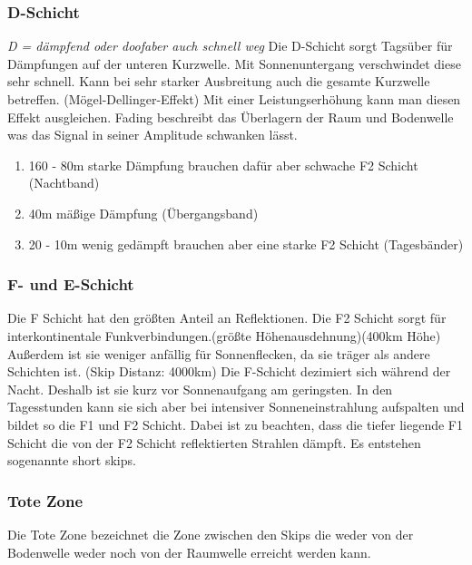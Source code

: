             \subsubsection[]{D-Schicht}
            {\it D = dämpfend oder doof\newline aber auch schnell weg } \newline
            Die D-Schicht sorgt Tagsüber für Dämpfungen auf der unteren Kurzwelle. Mit Sonnenuntergang verschwindet diese sehr schnell. Kann bei sehr starker Ausbreitung auch die gesamte Kurzwelle betreffen. 
            (Mögel-Dellinger-Effekt) Mit einer Leistungserhöhung kann man diesen Effekt ausgleichen.
            Fading beschreibt das Überlagern der Raum und Bodenwelle was das Signal in seiner Amplitude schwanken lässt.
            \begin{enumerate}
                \item 160 - 80m starke Dämpfung brauchen dafür aber schwache F2 Schicht (Nachtband)
                \item 40m mäßige Dämpfung (Übergangsband)
                \item 20 - 10m wenig gedämpft brauchen aber eine starke F2 Schicht (Tagesbänder)
            \end{enumerate}
            \subsubsection[]{F- und E-Schicht}
            Die F Schicht hat den größten Anteil an Reflektionen. \newline
            Die F2 Schicht sorgt für interkontinentale Funkverbindungen.(größte Höhenausdehnung)(400km Höhe) Außerdem ist sie weniger anfällig für Sonnenflecken, da sie träger als andere Schichten ist. (Skip Distanz: 4000km)
            \newline 
            Die F-Schicht dezimiert sich während der Nacht. Deshalb ist sie kurz vor Sonnenaufgang am geringsten. In den Tagesstunden kann sie sich aber bei intensiver Sonneneinstrahlung aufspalten und bildet so die F1 und F2 Schicht.
            Dabei ist zu beachten, dass die tiefer liegende F1 Schicht die von der F2 Schicht reflektierten Strahlen dämpft. Es entstehen sogenannte \dq short skips\dq.

    \subsubsection[]{Tote Zone}
        Die Tote Zone bezeichnet die Zone zwischen den Skips die weder von der Bodenwelle weder noch von der Raumwelle erreicht werden kann.
